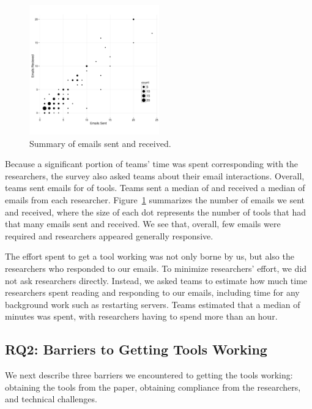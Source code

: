 \documentclass[10pt,conference]{IEEEtran}
\begin{document}
\begin{figure}[!ht]
  \centering
    \includegraphics[width=0.5\textwidth]{emailPlot.pdf}
  \caption{Summary of emails sent and received.}\label{fig:emailSnR}
\end{figure}

Because a significant portion of teams' time was
spent corresponding with the researchers,
the survey also asked teams about their email interactions.
Overall, teams sent emails for \emailsPercentSent of tools.
Teams sent a median of \emailsSent and received 
a median of \emailsRecieved emails from each researcher.
Figure~\ref{fig:emailSnR} summarizes the number of emails
we sent and received, where the size of each dot
represents the number of tools that had
that many emails sent and received.
We see that, overall, few emails were required
and researchers appeared generally responsive.

The effort spent to get a tool working was not only
borne by us, but also the researchers who 
responded to our emails.
To minimize researchers' effort, we did not ask researchers directly.
Instead, we asked teams to estimate how much time researchers spent 
reading and responding to our emails, including time for 
any background work such as restarting servers.
Teams estimated that a median of \durationAuthorResponse minutes 
was spent, with \durationAuthorResponseCountHigh researchers having
to spend more than an hour.

\subsection{RQ2: Barriers to Getting Tools Working}

We next describe three barriers we encountered 
to getting the tools working:
obtaining the tools from the paper,
obtaining compliance from the researchers,
and technical challenges. 
\end{document}
